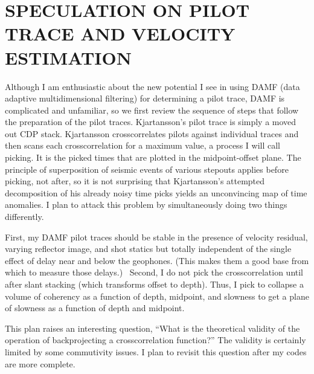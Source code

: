 \section{SPECULATION ON PILOT TRACE AND VELOCITY ESTIMATION}

\par
Although I am enthusiastic
about the new potential I see in using DAMF
(data adaptive multidimensional filtering)
for determining a pilot trace,
DAMF is complicated and unfamiliar,
so we first review the sequence of steps
that follow the preparation of the pilot traces.
Kjartansson's pilot trace is simply a moved out CDP stack.
Kjartansson crosscorrelates pilots against
individual traces and then scans each crosscorrelation
for a maximum value, a process I will call picking.
It is the picked times that are plotted in the midpoint-offset plane.
The principle of superposition of seismic events
of various stepouts applies before picking, not after,
so it is not surprising that Kjartansson's attempted decomposition
of his already noisy time picks yields an unconvincing map of time anomalies.
I plan to attack this problem by simultaneously doing two things differently.

\par
First, my DAMF pilot traces
should be stable in the presence of velocity residual,
varying reflector image,
and shot statics but totally
independent of the single effect
of delay near and below the geophones.
(This makes them a good base from which to measure those delays.)~
Second, I do not pick the crosscorrelation until after
slant stacking (which transforms offset to depth).
Thus, I pick to collapse a volume of coherency
as a function of depth, midpoint, and slowness
to get a plane of slowness as a function of depth and midpoint.
\par
This plan raises an interesting question,
``What is the theoretical validity of the operation of
backprojecting a crosscorrelation function?''
The validity is certainly limited by some commutivity issues.
I plan to revisit this question after my codes are more complete.

